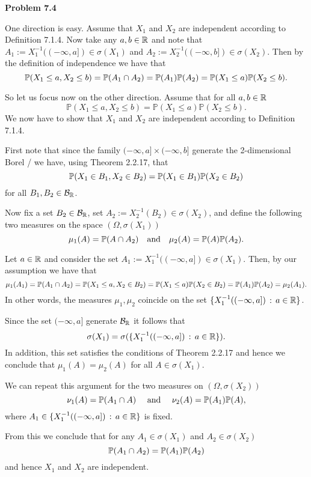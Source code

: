   

\textbf{Problem 7.4}

One direction is easy. Assume that $X_1$ and $X_2$ are independent according to Definition 7.1.4. Now take any $a,b \in \mathbb R$ and note that $A_1 := X_1^{-1}((-\infty,a]) \in \sigma(X_1)$ and $A_2 := X_2^{-1}((-\infty, b]) \in \sigma(X_2)$. Then by the definition of independence we have that
\[
	\mathbb{P}(X_1 \le a, X_2 \le b) = \mathbb P(A_1 \cap A_2) = \mathbb P(A_1) \mathbb P(A_2) = \mathbb{P}(X_1 \le a) \mathbb{P}(X_2 \le b).
\]

So let us focus now on the other direction. Assume that for all $a,b \in \mathbb R$
\[
	\mathbb{P}(X_1 \le a, X_2 \le b) = \mathbb{P}(X_1 \le a) \mathbb{P}(X_2 \le b).
\]
We now have to show that $X_1$ and $X_2$ are independent according to Definition 7.1.4.

First note that since the family $(-\infty, a] \times (-\infty ,b]$ generate the 2-dimensional Borel \sigalg/ we have, using Theorem 2.2.17, that
\[
	\mathbb P(X_1 \in B_1, X_2 \in B_2) = \mathbb P(X_1 \in B_1) \mathbb P(X_2 \in B_2)
\]
for all $B_1, B_2 \in \mathcal B_{\mathbb R}$.

Now fix a set $B_2 \in \mathcal B_{\mathbb R}$, set $A_2 := X_2^{-1}(B_2) \in \sigma(X_2)$, and define the following two measures on the space $(\Omega, \sigma(X_1))$
\[
	\mu_1(A) = \mathbb P(A \cap A_2) \quad \text{and} \quad \mu_2(A) = \mathbb P(A)\mathbb P(A_2).
\]  

Let $a \in \mathbb R$ and consider the set $A_1 := X_1^{-1}((-\infty ,a]) \in \sigma(X_1)$. Then, by our assumption we have that
\[
	\mu_1(A_1) = \mathbb P(A_1 \cap A_2) = \mathbb P(X_1 \le a, X_2 \in B_2) = \mathbb P(X_1 \le a) \mathbb P(X_2 \in B_2) = \mathbb P(A_1) \mathbb P(A_2)
	= \mu_2(A_1).
\]
In other words, the measures $\mu_1, \mu_2$ coincide on the set $\{X_1^{-1}((-\infty, a]) \, : \, a \in \mathbb R\}$.

Since the set $(-\infty,a]$ generate $\mathcal B_{\mathbb R}$ it follows that 
\[
	\sigma(X_1) = \sigma(\{X_1^{-1}((-\infty, a]) \, : \, a \in \mathbb R\}).
\]
In addition, this set satisfies the conditions of Theorem 2.2.17 and hence we conclude that $\mu_1(A) = \mu_2(A)$ for all $A \in \sigma(X_1)$.

We can repeat this argument for the two measures on $(\Omega, \sigma(X_2))$
\[
	\nu_1(A) = \mathbb P(A_1 \cap A) \quad \text{ and } \quad \nu_2(A) = \mathbb P(A_1) \mathbb P(A), 
\]
where $A_1 \in \{X_1^{-1}((-\infty, a]) \, : \, a \in \mathbb R\}$ is fixed. 

From this we conclude that for any $A_1 \in \sigma(X_1)$ and $A_2 \in \sigma(X_2)$
\[
	\mathbb P(A_1 \cap A_2) = \mathbb P(A_1)\mathbb P(A_2)
\]
and hence $X_1$ and $X_2$ are independent.